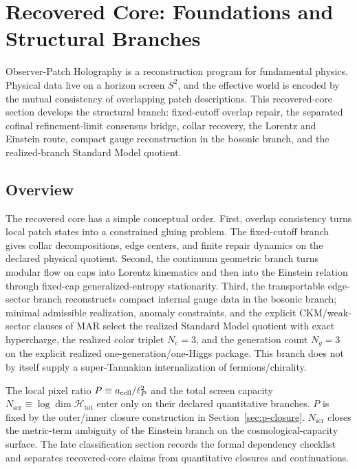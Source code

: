 \section{Recovered Core: Foundations and Structural Branches}\label{observer-patch-holography}

Observer-Patch Holography is a reconstruction program for fundamental physics. Physical data live
on a horizon screen \(S^2\), and the effective world is encoded by the mutual consistency of
overlapping patch descriptions. This recovered-core section develops the structural branch:
fixed-cutoff overlap repair, the separated cofinal refinement-limit consensus bridge, collar
recovery, the Lorentz and Einstein route, compact gauge reconstruction in the bosonic branch, and
the realized-branch Standard Model quotient.

\subsection{Overview}\label{overview}

The recovered core has a simple conceptual order. First, overlap consistency turns local patch
states into a constrained gluing problem. The fixed-cutoff branch gives collar decompositions,
edge centers, and finite repair dynamics on the declared physical quotient. Second, the continuum
geometric branch turns modular flow on caps into Lorentz kinematics and then into the Einstein
relation through fixed-cap generalized-entropy stationarity. Third, the transportable edge-sector
branch reconstructs compact internal gauge data in the bosonic branch; minimal admissible
realization, anomaly constraints, and the explicit CKM/weak-sector clauses of MAR select the
realized Standard Model quotient with exact hypercharge, the realized color triplet \(N_c=3\), and
the generation count \(N_g=3\) on the explicit realized one-generation/one-Higgs package. This
branch does not by itself supply a super-Tannakian internalization of fermions/chirality.

The local pixel ratio \(P \equiv a_{\rm cell}/\ell_P^2\) and the total screen capacity
\(N_{\mathrm{scr}} \equiv \log \dim \mathcal H_{\mathrm{tot}}\) enter only on their declared
quantitative branches. \(P\) is fixed by the outer/inner closure construction in
Section~\ref{sec:p-closure}. \(N_{\mathrm{scr}}\) closes the metric-term ambiguity of the Einstein
branch on the cosmological-capacity surface. The late classification section records the formal
dependency checklist and separates recovered-core claims from quantitative closures and
continuations.


